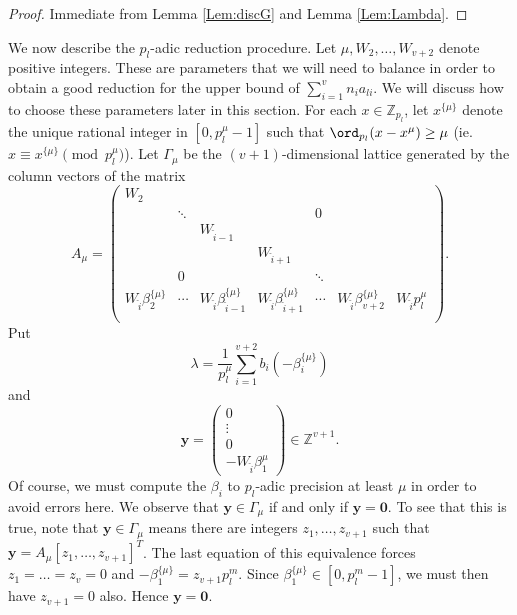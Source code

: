 {\begin{proof}
Immediate from Lemma \ref{Lem:discG} and Lemma \ref{Lem:Lambda}. 
\end{proof}

We now describe the $p_l$-adic reduction procedure. Let $\mu, W_2, \dots, W_{v+2}$ denote positive integers. These are parameters that we will need to balance in order to obtain a good reduction for the upper bound of 
$\sum_{i = 1}^v n_{i}a_{li}$. We will discuss how to choose these parameters later in this section. For each $x \in \mathbb{Z}_{p_l}$, let $x^{\{\mu\}}$ denote the unique rational integer in $[0,p_l^{\mu} - 1]$ such that $\ord_{p_l}(x - x^{\mu}) \geq \mu$ (ie. $x \equiv x^{\{\mu\}} \pmod{p_l^{\mu}}$). Let $\Gamma_{\mu}$ be the $(v+1)$-dimensional lattice generated by the column vectors of the matrix
\[A_{\mu} = 
\begin{pmatrix}
W_2 & 		&				&				&		&	&	\\
	& \ddots	& 				&				& 0		& 	&	\\
	&		& W_{\hat{i} - 1}	&				&		&	&	\\
	& 		& 				& W_{\hat{i} + 1}	&		&	&	\\	
	& 0		& 				& 				&\ddots	&	&	\\
W_{\hat{i}}\beta_2^{\{\mu\}}& \cdots & W_{\hat{i}}\beta_{\hat{i} - 1}^{\{\mu\}} & W_{\hat{i}}\beta_{\hat{i} + 1}^{\{\mu\}}& \cdots &W_{\hat{i}}\beta_{v+2}^{\{\mu\}}& W_{\hat{i}}p_l^{\mu}\\	
\end{pmatrix}.\]
Put
\[ \lambda = \frac{1}{p_l^{\mu}} \sum_{i = 1}^{v+2} b_i\left(-\beta_i^{\{\mu\}}\right)\]
and
\[\mathbf{y} = 
\begin{pmatrix}
0 \\
\vdots \\
0 \\
-W_{\hat{i}}\beta_1^{\mu}
\end{pmatrix}
\in \mathbb{Z}^{v+1}.\]
Of course, we must compute the $\beta_i$ to $p_l$-adic precision at least $\mu$ in order to avoid errors here. We observe that $\mathbf{y} \in \Gamma_{\mu}$ if and only if $\mathbf{y}= \mathbf{0}$. To see that this is true, note that $\mathbf{y} \in \Gamma_{\mu}$ means there are integers $z_1, \dots, z_{v+1}$ such that $\mathbf{y}=A_{\mu}[z_1, \dots, z_{v+1}]^{T}$. The last equation of this equivalence forces $z_1 = \dots = z_{v} = 0$ and $-\beta_1^{\{\mu\}} = z_{v+1}p_l^{m}$. Since $\beta_1^{\{\mu\}} \in [0, p_l^m - 1]$, we must then have $z_{v+1} = 0$ also. Hence $\mathbf{y} = \mathbf{0}$. 

}
